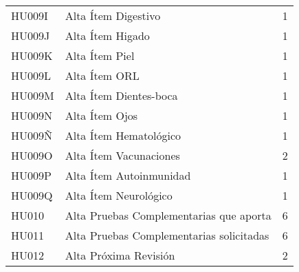 \begin{table}[!h]
\begin{tabular}{llr}
HU009I                                                     & Alta Ítem Digestivo								& 1                                                          
\\
\rowcolor[HTML]{EFEFEF} 
HU009J                                                     & Alta Ítem Higado									& 1                                                          
\\
HU009K                                                     & Alta Ítem Piel										& 1                                                          
\\
\rowcolor[HTML]{EFEFEF} 
HU009L                                                     & Alta Ítem ORL										& 1
\\
HU009M                                                     & Alta Ítem Dientes-boca								& 1
\\
\rowcolor[HTML]{EFEFEF} 
HU009N                                                     & Alta Ítem Ojos										& 1
\\
HU009Ñ                                                     & Alta Ítem Hematológico								& 1
\\
\rowcolor[HTML]{EFEFEF} 
HU009O                                                     & Alta Ítem Vacunaciones								& 2
\\
HU009P                                                     & Alta Ítem Autoinmunidad							& 1
\\
\rowcolor[HTML]{EFEFEF} 
HU009Q                                                     & Alta Ítem Neurológico								& 1
\\
HU010                                                     & Alta Pruebas Complementarias que aporta			& 6
\\
\rowcolor[HTML]{EFEFEF} 
HU011                                                     & Alta Pruebas Complementarias solicitadas			& 6
\\
HU012                                                     & Alta Próxima Revisión								& 2
\\
\end{tabular}
\end{table}


